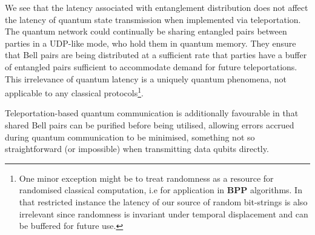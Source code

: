 We see that the latency associated with entanglement distribution does not affect the latency of quantum state transmission when implemented via teleportation. The quantum network could continually be sharing entangled pairs between parties in a UDP-like mode, who hold them in quantum memory. They ensure that Bell pairs are being distributed at a sufficient rate that parties have a buffer of entangled pairs sufficient to accommodate demand for future teleportations. This irrelevance of quantum latency is a uniquely quantum phenomena, not applicable to any classical protocols\footnote{One minor exception might be to treat randomness as a resource for randomised classical computation, i.e for application in \textbf{BPP} algorithms. In that restricted instance the latency of our source of random bit-strings is also irrelevant since randomness is invariant under temporal displacement and can be buffered for future use.}.

Teleportation-based quantum communication is additionally favourable in that shared Bell pairs can be purified before being utilised, allowing errors accrued during quantum communication to be minimised, something not so straightforward (or impossible) when transmitting data qubits directly.